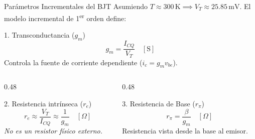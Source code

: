 \documentclass[aspectratio=169, table, xcdraw]{beamer}
\begin{document}
\begin{frame}{Parámetros Incrementales del BJT}
    Asumiendo $T \approx 300\,\text{K} \implies V_T \approx 25.85\,\text{mV}$. El modelo incremental de 1\textsuperscript{er} orden define:
    
    \vspace{0.2cm}
    \begin{block}{1. Transconductancia ($g_m$)}
        \begin{equation*}
            g_m = \frac{I_{CQ}}{V_T} \quad [\text{S}]
        \end{equation*}
        Controla la fuente de corriente dependiente ($i_c = g_m v_{be}$).
    \end{block}
    
    \begin{columns}
        \begin{column}{0.48\textwidth}
            \begin{block}{2. Resistencia intrínseca ($r_e$)}
                \begin{equation*}
                    r_e \approx \frac{V_T}{I_{CQ}} \approx \frac{1}{g_m} \quad [\Omega]
                \end{equation*}
                \textit{No es un resistor físico externo.}
            \end{block}
        \end{column}
        \begin{column}{0.48\textwidth}
            \begin{block}{3. Resistencia de Base ($r_\pi$)}
                \begin{equation*}
                    r_\pi = \frac{\beta}{g_m} \quad [\Omega]
                \end{equation*}
                Resistencia vista desde la base al emisor.
            \end{block}
        \end{column}
    \end{columns}
\end{frame}
\end{document}
